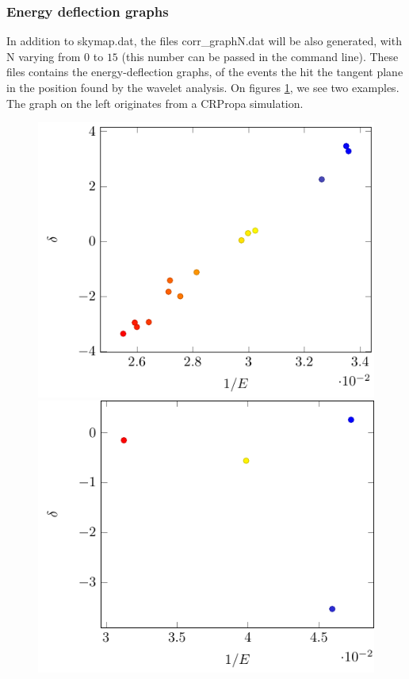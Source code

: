 \documentclass[12pt]{article}
\begin{document}
\subsubsection{Energy deflection graphs}
In addition to skymap.dat, the files {\color{textcolor}corr\_graphN.dat} will be also generated, 
with N varying from $0$ to $15$ (this number can be passed in the command line). These files contains the energy-deflection graphs,
of the events the hit the tangent plane in the position found by the wavelet
analysis. On figures \ref{deflections}, we see two examples. The graph on the left
originates from a CRPropa simulation. \\
\begin{figure}
\centering
\includegraphics[scale=0.8]{corr_graph.pdf} 
\includegraphics[scale=0.8]{corr_graph-sim.pdf}
\label{deflections}
\end{figure}
\end{document}
